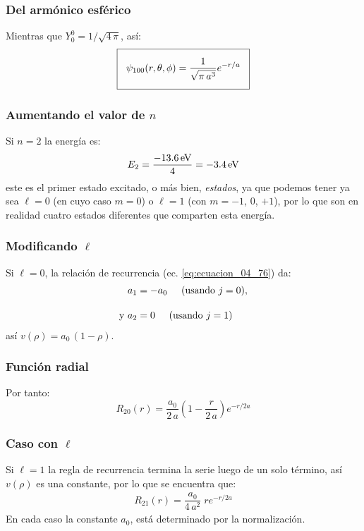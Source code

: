 \documentclass[12pt]{beamer}
\begin{document}
\begin{frame}
\frametitle{Del armónico esférico}
Mientras que $Y_{0}^{0} = 1 / \sqrt{4 \, \pi}$, así:
\pause
\begin{align}
\setlength{\fboxsep}{3\fboxsep}\boxed{\psi_{100} (r, \theta, \phi) = \dfrac{1}{\sqrt{\pi \, a^{3}}} e^{-r/a}}
\label{eq:ecuacion_04_80}
\end{align}
\end{frame}
\begin{frame}
\frametitle{Aumentando el valor de $n$}
Si $n = 2$ la energía es:
\pause
\begin{align}
E_{2} = \dfrac{\SI{-13.6}{\electronvolt}}{4} =  \SI{- 3.4}{\electronvolt}
\label{eq:ecuacion_04_81}
\end{align}
este es el primer estado excitado, o más bien, \textit{estados}, ya que podemos tener ya sea $\ell = 0$ (en cuyo caso $m = 0$) o $\ell = 1$ (con $m = -1$, $0$, $+ 1$), por lo que son en realidad cuatro estados diferentes que comparten esta energía.
\end{frame}
\begin{frame}
\frametitle{Modificando $\ell$}
Si $\ell = 0$, la relación de recurrencia (ec. \ref{eq:ecuacion_04_76}) da:
\pause
\begin{align*}
a_{1} &= - a_{0} \hspace{0.5cm} \text{(usando } j = 0 \text{)}, \\[1em]
\text{y } a_{2} &= 0 \hspace{0.5cm} \text{(usando } j = 1 \text{)}
\end{align*}
así $v(\rho) = a_{0} \, (1 - \rho)$.
\end{frame}
\begin{frame}
\frametitle{Función radial}
Por tanto:
\pause
\begin{equation}
R_{20} (r) = \dfrac{a_{0}}{2 \, a} \left(1 - \dfrac{r}{2 \, a} \right) e^{-r/2a}
\label{eq:ecuacion_04_82}
\end{equation}
\end{frame}
\begin{frame}
\frametitle{Caso con $\ell$}
Si $\ell = 1$ la regla de recurrencia termina la serie luego de un solo término, así $v(\rho)$ es una constante, por lo que se encuentra que:
\pause
\begin{align}
R_{21} (r) = \dfrac{a_{0}}{4 \, a^{2}} \; r e^{-r/2a}
\label{eq:ecuacion_04_83}
\end{align}
En cada caso la constante $a_{0}$, está determinado por la normalización.
\end{frame}
\end{document}
